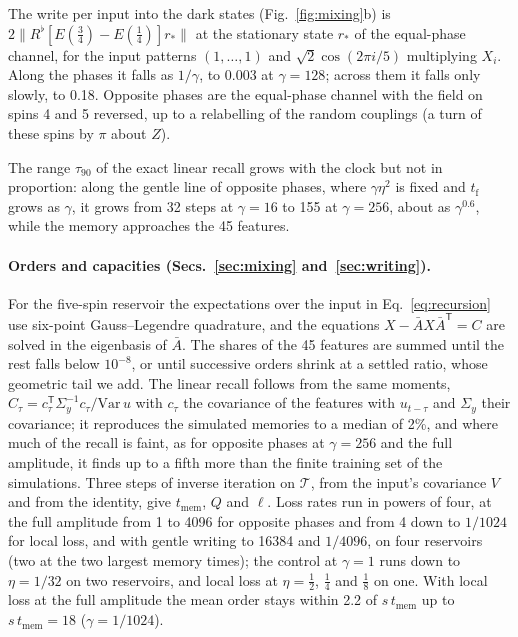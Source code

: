 The write per input into the dark states (Fig.~\ref{fig:mixing}b) is $2\|R^\flat[E(\tfrac34)-E(\tfrac14)]r_*\|$ at the
stationary state $r_*$ of the equal-phase channel, for the input patterns $(1,\dots,1)$ and $\sqrt2\cos(2\pi i/5)$
multiplying $X_i$. Along the phases it falls as $1/\gamma$, to 0.003 at $\gamma=128$; across them it falls only
slowly, to 0.18. Opposite phases are the equal-phase channel with the field on spins 4 and 5 reversed, up to a
relabelling of the random couplings (a turn of these spins by $\pi$ about $Z$).

The range $\tau_{90}$ of the exact linear recall grows with the clock but not in proportion: along the gentle line of
opposite phases, where $\gamma\eta^2$ is fixed and $t_{\mathrm f}$ grows as $\gamma$, it grows from 32 steps at
$\gamma=16$ to 155 at $\gamma=256$, about as $\gamma^{0.6}$, while the memory approaches the 45 features.

\paragraph{Orders and capacities (Secs.~\ref{sec:mixing} and~\ref{sec:writing}).}
For the five-spin reservoir the expectations over the input in Eq.~\eqref{eq:recursion} use six-point
Gauss--Legendre quadrature, and the equations $X-\bar AX\bar A^{\mathsf T}=C$ are solved in the eigenbasis of $\bar A$.
The shares of the 45 features are summed until the rest falls below $10^{-8}$, or until successive orders shrink at a
settled ratio, whose geometric tail we add. The linear recall follows from the same moments,
$C_\tau=c_\tau^{\mathsf T}\Sigma_y^{-1}c_\tau/\mathrm{Var}\,u$ with $c_\tau$ the covariance of the features with
$u_{t-\tau}$ and $\Sigma_y$ their covariance; it reproduces the simulated memories to a median of 2\%, and where much
of the recall is faint, as for opposite phases at $\gamma=256$ and the full amplitude, it finds up to a fifth more than
the finite training set of the simulations. Three steps of inverse iteration on $\mathcal T$, from the input's
covariance $V$ and from the identity, give $t_{\mathrm{mem}}$, $Q$ and $\ell$. Loss rates run in powers of four, at
the full amplitude from 1 to 4096 for opposite phases and from 4 down to $1/1024$ for local loss, and with gentle
writing to 16384 and $1/4096$, on four reservoirs (two at the two largest memory times); the control at $\gamma=1$ runs
down to $\eta=1/32$ on two reservoirs, and local loss at $\eta=\tfrac12$, $\tfrac14$ and $\tfrac18$ on one. With local loss at the full amplitude the mean order stays within 2.2 of $s\,t_{\mathrm{mem}}$
up to $s\,t_{\mathrm{mem}}=18$ ($\gamma=1/1024$).

